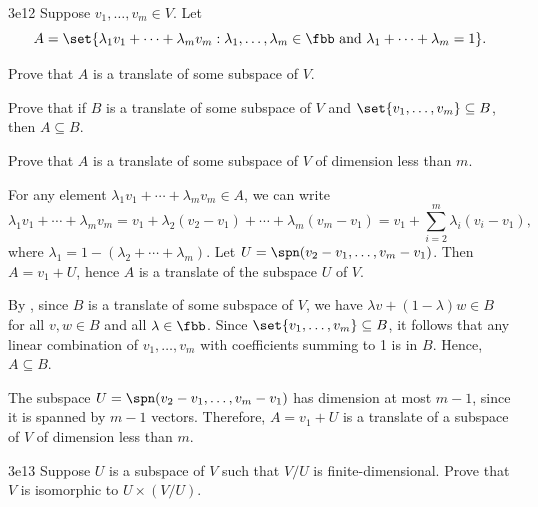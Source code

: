 \begin{exercise}{3e12}
    Suppose $v_1, \ldots, v_m \in V$.
	Let
    \[
    	A = \set{\lambda_1 v_1 + \cdots + \lambda_m v_m : \lambda_1, \ldots, \lambda_m \in \fbb \text{ and } \lambda_1 + \cdots + \lambda_m = 1}.
    \]
    \begin{subexercises}
        \item Prove that $A$ is a translate of some subspace of $V$.
        \item Prove that if $B$ is a translate of some subspace of $V$ and $\set{v_1, \ldots, v_m} \subseteq B$, then $A \subseteq B$.
        \item Prove that $A$ is a translate of some subspace of $V$ of dimension less than $m$.
    \end{subexercises}
\end{exercise}

\begin{solenum}
    \item For any element $\lambda_1 v_1 + \cdots + \lambda_m v_m \in A$, we can write
    \[
    	\lambda_1 v_1 + \cdots + \lambda_m v_m = v_1 + \lambda_2 (v_2 - v_1) + \cdots + \lambda_m (v_m - v_1) = v_1 + \sum_{i = 2}^m \lambda_i (v_i - v_1),
    \]
    where $\lambda_1 = 1 - (\lambda_2 + \cdots + \lambda_m)$.
	Let $U = \spn(v_2 - v_1, \ldots, v_m - v_1)$.
	Then $A = v_1 + U$, hence $A$ is a translate of the subspace $U$ of $V$.
    \item By , since $B$ is a translate of some subspace of $V$, we have $\lambda v + (1 - \lambda) w \in B$ for all $v, w \in B$ and all $\lambda \in \fbb$.
	Since $\set{v_1, \ldots, v_m} \subseteq B$, it follows that any linear combination of $v_1, \ldots, v_m$ with coefficients summing to 1 is in $B$.
	Hence, $A \subseteq B$.
    \item The subspace $U = \spn(v_2 - v_1, \ldots, v_m - v_1)$ has dimension at most $m - 1$, since it is spanned by $m - 1$ vectors.
	Therefore, $A = v_1 + U$ is a translate of a subspace of $V$ of dimension less than $m$.
\end{solenum}

\begin{exercise}{3e13}
    Suppose $U$ is a subspace of $V$ such that $V / U$ is finite-dimensional.
	Prove that $V$ is isomorphic to $U \times (V / U)$.
\end{exercise}

